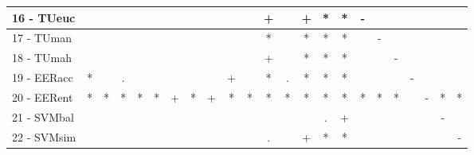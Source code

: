 \begin{table}[h]
\begin{center}
\begin{tabular}{lcc|cc|cc|cc|cc|cc|cc|cc|cc|cc|cc}
16 - TUeuc	&   &   &   &   &   &   &   &   &   &   & + &   & + & * & * & - &   &   &   &   &   &   \\ \hline
17 - TUman	&   &   &   &   &   &   &   &   &   &   & * &   & * & * & * &   & - &   &   &   &   &   \\
18 - TUmah	&   &   &   &   &   &   &   &   &   &   & + &   & * & * & * &   &   & - &   &   &   &   \\ \hline
19 - EERacc	& * &   & . &   &   &   &   &   & + &   & * & . & * & * & * &   &   &   & - &   &   &   \\
20 - EERent	& * & * & * & * & * & + & * & + & * & * & * & * & * & * & * & * & * & * &   & - & * & * \\ \hline
21 - SVMbal	&   &   &   &   &   &   &   &   &   &   &   &   &   & . & + &   &   &   &   &   & - &   \\
22 - SVMsim	&   &   &   &   &   &   &   &   &   &   & . &   & + & * & * &   &   &   &   &   &   & - \\ \hline\end{tabular}
\label{stratsfriedSVM}
\end{center}
\end{table}